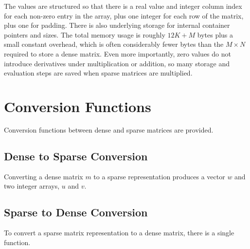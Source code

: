 \begin{description}
{\begin{description}
The values are structured so that there is a real value and integer column index for each non-zero entry in the array, plus one integer for each row of the matrix, plus one for padding.  There is also underlying storage for internal container pointers and sizes.  The total memory usage is roughly $12 K + M$ bytes plus a small constant overhead, which is often considerably fewer bytes than the $M \times N$ required to store a dense matrix.  Even more importantly, zero values do not introduce derivatives under multiplication or addition, so many storage and evaluation steps are saved when sparse matrices are multiplied.


\section{Conversion Functions}


Conversion functions between dense and sparse matrices are provided.


\subsection{Dense to Sparse Conversion}


Converting a dense matrix $m$ to a sparse representation produces a vector $w$ and two integer arrays, $u$ and $v$.


\begin{description}          \end{description}


\subsection{Sparse to Dense Conversion}


To convert a sparse matrix representation to a dense matrix, there is a single function.


\begin{description}    \end{description}



\end{description}}
\end{description}
